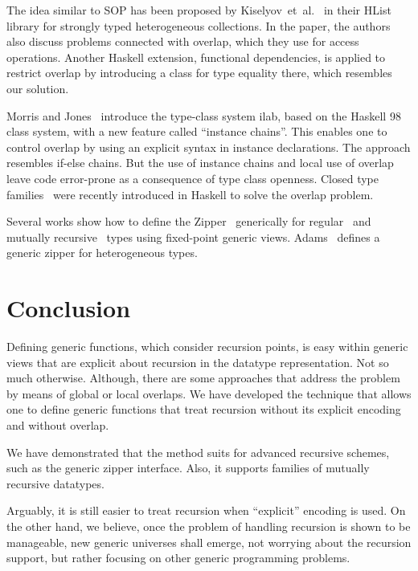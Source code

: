 \documentclass[runningheads]{llncs}
\begin{document}
The idea similar to SOP has been proposed by Kiselyov~et~al.~\cite{Kiselyov2004} in their \textsf{HList} library for strongly typed heterogeneous collections. In the paper, the authors also discuss problems connected with overlap, which they use for access operations. Another Haskell extension, functional dependencies, is applied to restrict overlap by introducing a class for type equality there, which resembles our solution.

Morris and Jones~\cite{Morris2010} introduce the type-class system \textsf{ilab}, based on the Haskell 98 class system, with a new feature called ``instance chains''. This enables one to control overlap by using an explicit syntax in instance declarations. The approach resembles if-else chains. But the use of instance chains and local use of overlap leave code error-prone as a consequence of type class openness. Closed type families~\cite{Eisenberg2014} were recently introduced in Haskell to solve the overlap problem.

Several works show how to define the Zipper~\cite{Huet1997} generically for regular~\cite{HiJeLo2004,McBride2001} and mutually recursive~\cite{MuRec2009} types using fixed-point generic views. Adams~\cite{Adams2010} defines a generic zipper for heterogeneous types.



\section{Conclusion}
\label{sec:conclusion}

Defining generic functions, which consider recursion points, is easy within generic views that are explicit about recursion in the datatype representation. Not so much otherwise. Although, there are some approaches that address the problem by means of global or local overlaps. We have developed the technique that allows one to define generic functions that treat recursion without its explicit encoding and without overlap. 

We have demonstrated that the method suits for advanced recursive schemes, such as the generic zipper interface. Also, it supports families of mutually recursive datatypes. 

Arguably, it is still easier to treat recursion when ``explicit'' encoding is used. On the other hand, we believe, once the problem of handling recursion is shown to be manageable, new generic universes shall emerge, not worrying about the recursion support, but rather focusing on other generic programming problems.

%
%
%


%
\end{document}
